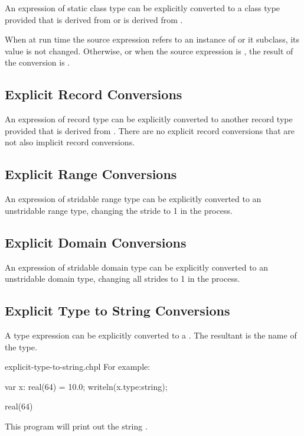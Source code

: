 An expression of static class type  can be explicitly
converted to a class type  provided that  is derived
from  or  is derived from .

When at run time the source expression refers to an instance of
 or it subclass, its value is not changed.
Otherwise, or when the source expression is ,
the result of the conversion is .

\subsection{Explicit Record Conversions}
\label{Explicit_Record_Conversions}

An expression of record type  can be explicitly converted to
another record type  provided that  is derived
from .  There are no explicit record conversions that are not
also implicit record conversions.

\subsection{Explicit Range Conversions}
\label{Explicit_Range_Conversions}

An expression of stridable range type can be explicitly converted
to an unstridable range type, changing the stride to 1 in the process.

\subsection{Explicit Domain Conversions}
\label{Explicit_Domain_Conversions}

An expression of stridable domain type can be explicitly converted
to an unstridable domain type, changing all strides to 1 in the process.

\subsection{Explicit Type to String Conversions}
\label{Explicit_Type_to_String_Conversions}

A type expression can be explicitly converted to a . The resultant
 is the name of the type.

\begin{chapelexample}{explicit-type-to-string.chpl}
For example:
\begin{chapel}
var x: real(64) = 10.0;
writeln(x.type:string);
\end{chapel}
\begin{chapeloutput}
real(64)
\end{chapeloutput}
This program will print out the string .
\end{chapelexample}
